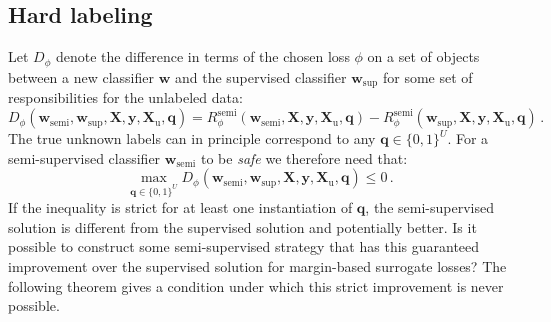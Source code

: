 \documentclass[twoside]{memoir}\usepackage[]{graphicx}\usepackage{xcolor}
\begin{document}
\subsection{Hard labeling}

Let $ {D}_\phi$ denote the difference in terms of the chosen loss $\phi$ on a set of objects between a new classifier $\mathbf{w}$ and the supervised classifier $\mathbf{w}_\mathrm{sup}$ for some set of responsibilities for the unlabeled data:
\begin{equation} \label{eq:difference}
{D}_\phi(\mathbf{w}_\mathrm{semi},\mathbf{w}_\mathrm{sup},\mathbf{X},\mathbf{y},\mathbf{X}_\mathrm{u},\mathbf{q}) =  {R}^\mathrm{semi}_\phi(\mathbf{w}_\mathrm{semi},\mathbf{X},\mathbf{y},\mathbf{X}_\mathrm{u},\mathbf{q}) \nonumber  - {R}^\mathrm{semi}_\phi(\mathbf{w}_\mathrm{sup},\mathbf{X},\mathbf{y},\mathbf{X}_\mathrm{u},\mathbf{q}) \, .
\end{equation}
The true unknown labels can in principle correspond to any $\mathbf{q} \in \{0,1\}^U$. For a semi-supervised classifier $\mathbf{w}_\mathrm{semi}$ to be \emph{safe} we therefore need that:
\begin{equation} \label{eq:hardcondition}
\max_{\mathbf{q} \in \{{0},{1}\}^U} {D}_\phi(\mathbf{w}_\mathrm{semi},\mathbf{w}_\mathrm{sup},\mathbf{X},\mathbf{y},\mathbf{X}_\mathrm{u},\mathbf{q}) \leq 0 \,.
\end{equation}
If the inequality is strict for at least one instantiation of $\mathbf{q}$, the semi-supervised solution is different from the supervised solution and potentially better.
Is it possible to construct some semi-supervised strategy  that has this guaranteed improvement over the supervised solution for margin-based surrogate losses? The following theorem gives a condition under which this strict improvement is never possible.
\end{document}
